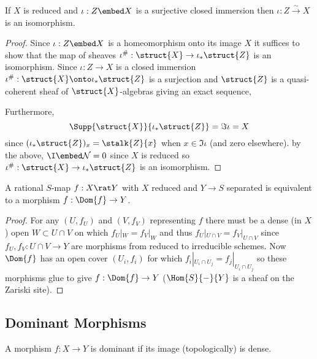 \documentclass[12pt]{article}
\begin{document}
\begin{corollary}
If $X$ is reduced and $\iota : Z \embed X$ is a surjective closed immersion then $\iota : Z \xrightarrow{\sim} X$ is an isomorphism. 
\end{corollary}

\begin{proof}
Since $\iota: Z \embed X$ is a homeomorphism onto its image $X$ it suffices to show that the map of sheaves $\iota^\# : \struct{X} \to \iota_* \struct{Z}$ is an isomorphism. Since $\iota : Z \to X$ is a closed immersion $\iota^\# : \struct{X} \onto \iota_* \struct{Z}$ is a surjection and $\struct{Z}$ is a quasi-coherent sheaf of $\struct{X}$-algebras giving an exact sequence,
\begin{center}
\end{center} Furthermore, 
\[ \Supp{\struct{X}}{\iota_* \struct{Z}} = \Im{\iota} = X \]
since $(\iota_* \struct{Z})_x = \stalk{Z}{x}$ when $x \in \Im{\iota}$ (and zero elsewhere). by the above, $\I \embed \Nil = 0$ since $X$ is reduced so $\iota^\# : \struct{X} \to \iota_* \struct{Z}$ is an isomorphism.  
\end{proof}

\begin{lemma}
A rational $S$-map $f : X \rat Y$ with $X$ reduced and $Y \to S$ separated is equivalent to a morphism $f : \Dom{f} \to Y$. 
\end{lemma}

\begin{proof}
For any $(U, f_U)$ and $(V, f_V)$ representing $f$ there must be a dense (in $X$) open $W \subset U \cap V$ on which $f_U|_W = f_V|_W$ and thus $f_U |_{U \cap V} = f_V |_{U \cap V}$ since $f_U, f_V : U \cap V \to Y$ are morphisms from reduced to irreducible schemes. Now $\Dom{f}$ has an open cover $(U_i, f_i)$ for which $f_i |_{U_i \cap U_j} = f_j |_{U_i \cap U_j}$ so these morphisms glue to give $f : \Dom{f} \to Y$ ($\Hom{S}{-}{Y}$ is a sheaf on the Zariski site).  
\end{proof}

\subsection{Dominant Morphisms}

\begin{definition}
A morphism $f : X \to Y$ is dominant if its image (topologically) is dense.
\end{definition}
\end{document}
